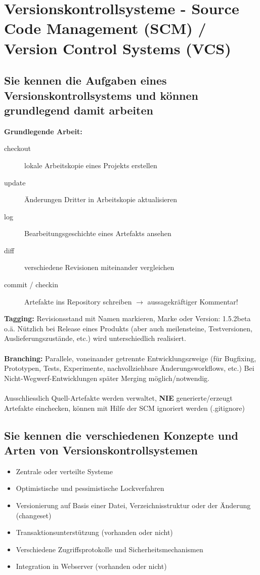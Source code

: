 \documentclass[a4paper]{article}
\begin{document}
	\newpage	
	\section{Versionskontrollsysteme - Source Code Management (SCM) / Version Control Systems (VCS)}
	
		\subsection{Sie kennen die Aufgaben eines Versionskontrollsystems und können grundlegend damit arbeiten}
		\textbf{Grundlegende Arbeit:}
		\begin{description}
			\item[checkout] lokale Arbeitskopie eines Projekts erstellen
			\item[update] Änderungen Dritter in Arbeitskopie aktualisieren
			\item[log] Bearbeitungsgeschichte eines Artefakts ansehen
			\item[diff] verschiedene Revisionen miteinander vergleichen
			\item[commit / checkin] Artefakte ins Repository schreiben $\rightarrow$ aussagekräftiger Kommentar!
		\end{description}
		\textbf{Tagging:} Revisionsstand mit Namen markieren, Marke oder Version: 1.5.2beta o.ä. Nützlich bei Release eines Produkts (aber auch meilensteine, Testversionen, Auslieferungszustände, etc.) wird unterschiedlich realisiert.\\
		\\
		\textbf{Branching:} Parallele, voneinander getrennte Entwicklungszweige (für Bugfixing, Prototypen, Tests, Experimente, nachvollziehbare Änderungsworkflows, etc.) Bei Nicht-Wegwerf-Entwicklungen später Merging möglich/notwendig.\\
		\\
		Ausschliesslich Quell-Artefakte werden verwaltet, \textbf{NIE} generierte/erzeugt Artefakte einchecken, können mit Hilfe der SCM ignoriert werden (.gitignore)
		
		\subsection{Sie kennen die verschiedenen Konzepte und Arten von Versionskontrollsystemen}
		\begin{itemize}
			\item Zentrale oder verteilte Systeme 
			\item Optimistische und pessimistische Lockverfahren 
			\item Versionierung auf Basis einer Datei, Verzeichnisstruktur oder der Änderung (changeset) 
			\item Transaktionsunterstützung (vorhanden oder nicht) 
			\item Verschiedene Zugriffsprotokolle und Sicherheitsmechanismen 
			\item Integration in Webserver (vorhanden oder nicht)
		\end{itemize}
		
\end{document}
